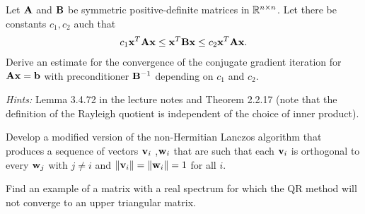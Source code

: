 
\begin{Sheet}
  \label{sheet12}
  
  \begin{Problem}
	  Let $\mathbf A$ and $\mathbf B$ be symmetric positive-definite matrices in $\mathbb R^{n\times n}$.
	  Let there be constants $c_1,c_2$ auch that 
	  \begin{gather*}
		  c_1 \mathbf x^T\mathbf A\mathbf x \leq \mathbf x^T\mathbf B\mathbf x \leq c_2 \mathbf x^T\mathbf A\mathbf x.
	  \end{gather*}
	  Derive an estimate for the convergence of the conjugate gradient iteration for $\mathbf A\mathbf x=\mathbf b$ with preconditioner $\mathbf B^{-1}$ depending on $c_1$ and $c_2$.

	  \textit{Hints:} Lemma 3.4.72 in the lecture notes and Theorem 2.2.17 (note that the definition of the Rayleigh quotient is independent of the choice of inner product).

  \end{Problem}
  
  \begin{Problem}
    Develop a modified version of the non-Hermitian Lanczos algorithm
    that produces a sequence of vectors $\mathbf v_i$ ,$\mathbf w_i$ that are such
    that each $\mathbf v_i$ is orthogonal to every $\mathbf w_j$ with $j\neq i$
    and $\lVert\mathbf v_i\rVert=\lVert\mathbf w_i\rVert=1$ for all $i$.
  \end{Problem}

	\begin{Problem}
		Find an example of a matrix with a real spectrum for which the QR method will not converge to an upper triangular matrix.

	\end{Problem}

  \vfill
  
  

\end{Sheet}


